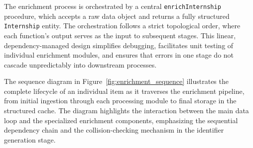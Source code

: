 The enrichment process is orchestrated by a central \texttt{enrichInternship} procedure, which accepts a raw data object and returns a fully structured \texttt{Internship} entity. The orchestration follows a strict topological order, where each function's output serves as the input to subsequent stages. This linear, dependency-managed design simplifies debugging, facilitates unit testing of individual enrichment modules, and ensures that errors in one stage do not cascade unpredictably into downstream processes.

The sequence diagram in Figure~\ref{fig:enrichment_sequence} illustrates the complete lifecycle of an individual item as it traverses the enrichment pipeline, from initial ingestion through each processing module to final storage in the structured cache. The diagram highlights the interaction between the main data loop and the specialized enrichment components, emphasizing the sequential dependency chain and the collision-checking mechanism in the identifier generation stage.

